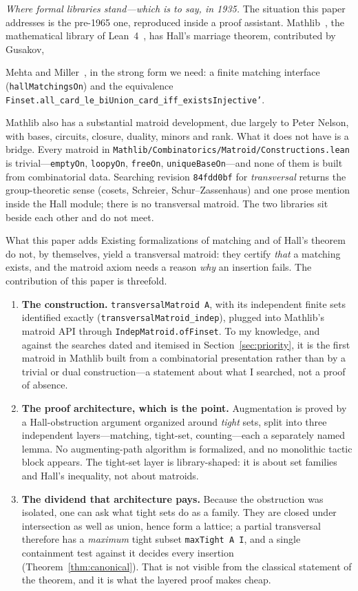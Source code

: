 \documentclass[11pt]{article}
\newcommand{\lean}[1]{\texttt{#1}}
\begin{document}
\emph{Where formal libraries stand---which is to say, in 1935.} The situation this paper addresses
is the pre-1965 one, reproduced inside a proof assistant. Mathlib~\cite{mathlib}, the mathematical
library of Lean~4~\cite{lean4}, has Hall's marriage theorem, contributed by Gusakov,
{\sloppy Mehta and Miller~\cite{gusakov}, in the strong form we need: a finite matching interface
(\lean{hallMatchingsOn}) and the equivalence
\lean{Finset.all\_card\_le\_biUnion\_card\_iff\_existsInjective'}.\par} Mathlib also has a substantial
matroid development, due largely to Peter Nelson, with bases, circuits, closure, duality, minors
and rank. What it does not have is a bridge. Every matroid in
\lean{Mathlib/Combinatorics/Matroid/Constructions.lean} is trivial---\lean{emptyOn},
\lean{loopyOn}, \lean{freeOn}, \lean{uniqueBaseOn}---and none of them is built from combinatorial
data. Searching revision \lean{84fdd0bf} for \emph{transversal} returns the group-theoretic sense
(cosets, Schreier, Schur--Zassenhaus) and one prose mention inside the Hall module; there is no
transversal matroid. The two libraries sit beside each other and do not meet.

\begin{contribbox}{What this paper adds}
Existing formalizations of matching and of Hall's theorem do not, by themselves, yield a
transversal matroid: they certify \emph{that} a matching exists, and the matroid axiom needs a
reason \emph{why} an insertion fails. The contribution of this paper is threefold.
\begin{enumerate}\itemsep2pt
\item \textbf{The construction.} \lean{transversalMatroid A}, with its independent finite sets
identified exactly (\lean{transversalMatroid\_indep}), plugged into Mathlib's matroid API through
\lean{IndepMatroid.ofFinset}. To my knowledge, and against the searches dated and itemised in
Section~\ref{sec:priority}, it is the first matroid in Mathlib built from a combinatorial
presentation rather than by a trivial or dual construction---a statement about what I searched,
not a proof of absence.
\item \textbf{The proof architecture, which is the point.} Augmentation is proved by a
Hall-obstruction argument organized around \emph{tight} sets, split into three independent
layers---matching, tight-set, counting---each a separately named lemma. No augmenting-path
algorithm is formalized, and no monolithic tactic block appears. The tight-set layer is
library-shaped: it is about set families and Hall's inequality, not about matroids.
\item \textbf{The dividend that architecture pays.} Because the obstruction was isolated, one can
ask what tight sets do as a family. They are closed under intersection as well as union, hence
form a lattice; a partial transversal therefore has a \emph{maximum} tight subset
\lean{maxTight A I}, and a single containment test against it decides every insertion
(Theorem~\ref{thm:canonical}). That is not visible from the classical statement of the theorem, and
it is what the layered proof makes cheap.
\end{enumerate}
\end{contribbox}
\end{document}
